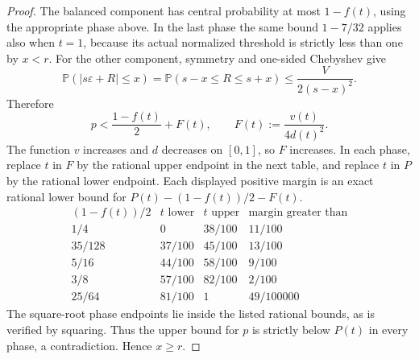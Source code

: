 \documentclass[11pt]{article}
\theoremstyle{remark}\newtheorem{remark}[theorem]{Remark}
\newcommand{\Pp}{\mathbb P}
\begin{document}
\begin{proof}
The balanced component has central probability at most $1-f(t)$,
using the appropriate phase above. In the last phase the same bound
$1-7/32$ applies also when $t=1$, because its actual normalized
threshold is strictly less than one by $x<r$.
For the other component, symmetry and one-sided Chebyshev give
\[
 \Pp(|s\varepsilon+R|\le x)
 =\Pp(s-x\le R\le s+x)
 \le\frac{V}{2(s-x)^2}.
\]
Therefore
\[
 p<\frac{1-f(t)}2+F(t),\qquad
 F(t):=\frac{v(t)}{4d(t)^2}.
\]
The function $v$ increases and $d$ decreases on $[0,1]$, so $F$
increases. In each phase, replace $t$ in $F$ by the rational upper
endpoint in the next table, and replace $t$ in $P$ by the rational
lower endpoint. Each displayed positive margin is an exact rational
lower bound for $P(t)-(1-f(t))/2-F(t)$.
\[
\begin{array}{c|c|c|c}
(1-f(t))/2&t\text{ lower}&t\text{ upper}&\text{margin greater than}\\\hline
1/4&0&38/100&11/100\\
35/128&37/100&45/100&13/100\\
5/16&44/100&58/100&9/100\\
3/8&57/100&82/100&2/100\\
25/64&81/100&1&49/100000
\end{array}
\]
The square-root phase endpoints lie inside the listed rational bounds,
as is verified by squaring. Thus the upper bound for $p$ is strictly
below $P(t)$ in every phase, a contradiction. Hence $x\ge r$.
\end{proof}
\end{document}
